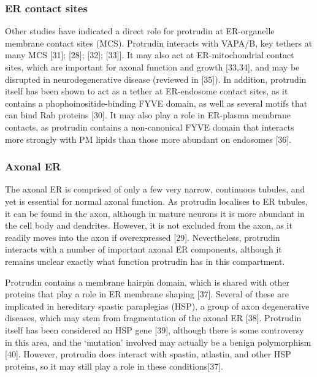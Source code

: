 \documentclass[
  12pt,
  a4paper,
]{article}
\begin{document}
\hypertarget{er-contact-sites}{%
\subsubsection{ER contact sites}\label{er-contact-sites}}

Other studies have indicated a direct role for protrudin at ER-organelle
membrane contact sites (MCS). Protrudin interacts with VAPA/B, key
tethers at many MCS {[}31{]}; {[}28{]}; {[}32{]}; {[}33{]}{]}. It may
also act at ER-mitochondrial contact sites, which are important for
axonal function and growth {[}33,34{]}, and may be disrupted in
neurodegenerative disease (reviewed in {[}35{]}). In addition, protrudin
itself has been shown to act as a tether at ER-endosome contact sites,
as it contains a phophoinositide-binding FYVE domain, as well as several
motifs that can bind Rab proteins {[}30{]}. It may also play a role in
ER-plasma membrane contacts, as protrudin contains a non-canonical FYVE
domain that interacts more strongly with PM lipids than those more
abundant on endosomes {[}36{]}.

\hypertarget{intro-ptdn-axonalER}{%
\subsubsection{Axonal ER}\label{intro-ptdn-axonalER}}

The axonal ER is comprised of only a few very narrow, continuous
tubules, and yet is essential for normal axonal function. As protrudin
localises to ER tubules, it can be found in the axon, although in mature
neurons it is more abundant in the cell body and dendrites. However, it
is not excluded from the axon, as it readily moves into the axon if
overexpressed {[}29{]}. Nevertheless, protrudin interacts with a number
of important axonal ER components, although it remains unclear exactly
what function protrudin has in this compartment.

Protrudin contains a membrane hairpin domain, which is shared with other
proteins that play a role in ER membrane shaping {[}37{]}. Several of
these are implicated in hereditary spastic paraplegias (HSP), a group of
axon degenerative diseases, which may stem from fragmentation of the
axonal ER {[}38{]}. Protrudin itself has been considered an HSP gene
{[}39{]}, although there is some controversy in this area, and the
`mutation' involved may actually be a benign polymorphism {[}40{]}.
However, protrudin does interact with spastin, atlastin, and other HSP
proteins, so it may still play a role in these conditions{[}37{]}.
\end{document}
